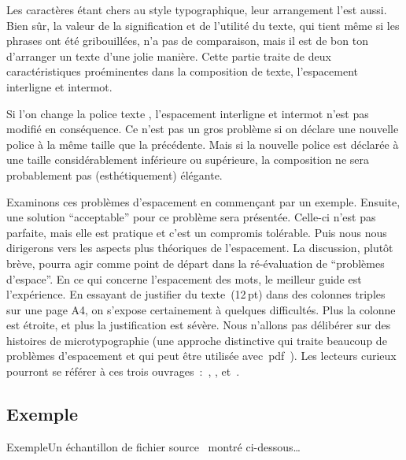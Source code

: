 \ii Les caract\`eres \'etant chers au style typographique, leur arrangement l'est aussi. Bien s\^ur, la valeur de la signification et de l'utilit\'e du texte, qui tient m\^eme si les phrases ont \'et\'e gribouill\'ees, n'a pas de comparaison, mais il est de bon ton d'arranger un texte d'une jolie mani\`ere. Cette partie traite de deux caract\'eristiques pro\'eminentes dans la composition de texte, l'espacement interligne et intermot.

Si l'on change la police texte \capstex, l'espacement interligne et intermot n'est pas modifi\'e en cons\'equence. Ce n'est pas un gros probl\`eme si on d\'eclare une nouvelle police \`a la m\^eme taille que la pr\'ec\'edente. Mais si la nouvelle police est d\'eclar\'ee \`a une taille consid\'erablement inf\'erieure ou sup\'erieure, la composition ne sera probablement pas (esth\'etiquement) \'el\'egante.

Examinons ces probl\`emes d'espacement en commen\c cant par un exemple. Ensuite, une solution ``acceptable'' pour ce probl\`eme sera pr\'esent\'ee. Celle-ci n'est pas parfaite, mais elle est pratique et c'est un compromis tol\'erable. Puis nous nous dirigerons vers les aspects plus th\'eoriques de l'espacement. La discussion, plut\^ot br\`eve, pourra agir comme point de d\'epart dans la r\'e-\'evaluation de ``probl\`emes d'espace''. En ce qui concerne l'espacement des mots, le meilleur guide est l'exp\-\'erience. En essayant de justifier du texte~(12\,pt) dans des colonnes triples sur une page A4, on s'expose certainement \`a quelques difficult\'es. Plus la colonne est \'etroite, et plus la justification est s\'ev\`ere. Nous n'allons pas d\'elib\'erer sur des histoires de microtypographie (une approche distinctive qui traite beaucoup de probl\`emes d'espacement et qui peut \^etre utilis\'ee avec~pdf\capstex\ ). Les lecteurs curieux pourront se r\'ef\'erer \`a ces trois ouvrages~:~\cite{zapf_microtypography}, \cite{thanh_microtypographic}, et~\cite{text_justification}.


\subsection{Exemple}{Exemple}Un \'echantillon de fichier source \capstex\, montr\'e ci-dessous\dots

